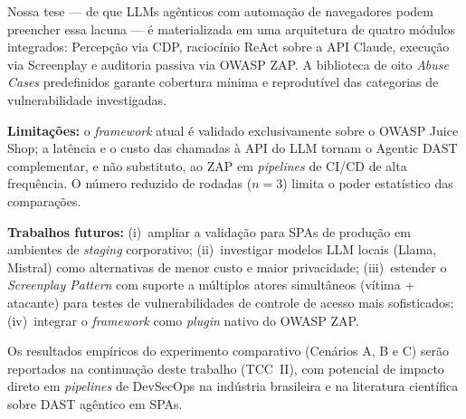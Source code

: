 \documentclass[
    10pt,
    twocolumn,
    a4paper
]{article}
\begin{document}
Nossa tese --- de que LLMs agênticos com automação de navegadores podem
preencher essa lacuna --- é materializada em uma arquitetura de quatro
módulos integrados: Percepção via CDP, raciocínio ReAct sobre a API
Claude, execução via Screenplay e auditoria passiva via OWASP ZAP.
A biblioteca de oito \textit{Abuse Cases} predefinidos garante cobertura
mínima e reprodutível das categorias de vulnerabilidade investigadas.

\textbf{Limitações:} o \textit{framework} atual é validado exclusivamente
sobre o OWASP Juice Shop; a latência e o custo das chamadas à API do LLM
tornam o Agentic DAST complementar, e não substituto, ao ZAP em
\textit{pipelines} de CI/CD de alta frequência. O número reduzido de
rodadas ($n = 3$) limita o poder estatístico das comparações.

\textbf{Trabalhos futuros:} (i)~ampliar a validação para SPAs de
produção em ambientes de \textit{staging} corporativo; (ii)~investigar
modelos LLM locais (Llama, Mistral) como alternativas de menor custo e
maior privacidade; (iii)~estender o \textit{Screenplay Pattern} com
suporte a múltiplos atores simultâneos (vítima + atacante) para testes
de vulnerabilidades de controle de acesso mais sofisticados;
(iv)~integrar o \textit{framework} como \textit{plugin} nativo do
OWASP ZAP.

Os resultados empíricos do experimento comparativo (Cenários A, B e C)
serão reportados na continuação deste trabalho (TCC~II), com potencial
de impacto direto em \textit{pipelines} de DevSecOps na indústria
brasileira e na literatura científica sobre DAST agêntico em SPAs.



\end{document}
